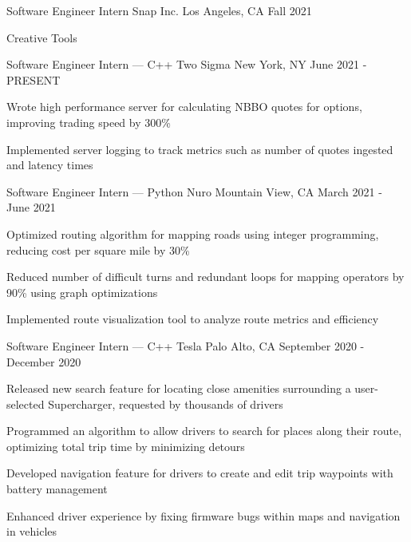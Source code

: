 \documentclass[12pt, letterpaper]{awesome-cv}
\begin{document}
\begin{cventries}
  \cventry
    {Sof\/tware Engineer Intern} %
    {Snap Inc.} %
    {Los Angeles, CA} %
    {Fall 2021} %
    {
      \begin{cvitems} %
        \item {Creative Tools}
      \end{cvitems}
    }

  \cventry
    {Sof\/tware Engineer Intern — C++} %
    {Two Sigma} %
    {New York, NY} %
    {June 2021 - PRESENT} %
    {
      \begin{cvitems} %
        \item {Wrote high performance server for calculating NBBO quotes for options, improving trading speed by 300\%}
        \item {Implemented server logging to track metrics such as number of quotes ingested and latency times}
      \end{cvitems}
    }

  \cventry
    {Sof\/tware Engineer Intern — Python} %
    {Nuro} %
    {Mountain View, CA} %
    {March 2021 - June 2021} %
    {
      \begin{cvitems} %
      	\item {Optimized routing algorithm for mapping roads using integer programming, reducing cost per square mile by 30\%}
      	\item {Reduced number of difficult turns and redundant loops for mapping operators by 90\% using graph optimizations}
      	\item {Implemented route visualization tool to analyze route metrics and efficiency}
      \end{cvitems}
    }

  \cventry
    {Sof\/tware Engineer Intern — C++} %
    {Tesla} %
    {Palo Alto, CA} %
    {September 2020 - December 2020} %
    {
      \begin{cvitems} %
        \item {Released new search feature for locating close amenities surrounding a user-selected Supercharger, requested by thousands of drivers}
        \item {Programmed an algorithm to allow drivers to search for places along their route, optimizing total trip time by minimizing detours}
        \item {Developed navigation feature for drivers to create and edit trip waypoints with battery management}
        \item {Enhanced driver experience by fixing firmware bugs within maps and navigation in vehicles}
      \end{cvitems}
    }


\end{cventries}
\end{document}
